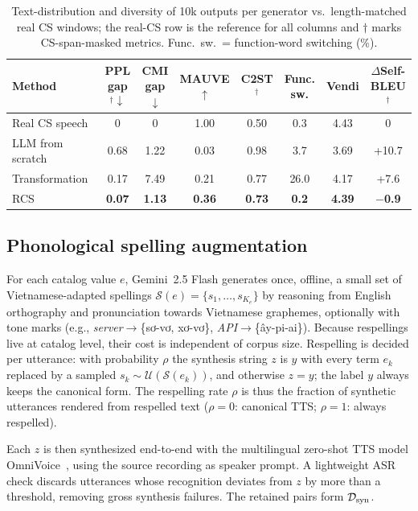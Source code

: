 \documentclass[letterpaper]{article}
\newcommand{\vi}[1]{{\fontencoding{T5}\selectfont #1}}
\newcommand{\vi}[1]{#1}
\newcommand{\cD}{\mathcal{D}}
\newcommand{\cS}{\mathcal{S}}
\begin{document}
\begin{table}[t]
  \centering
  \caption{Text-distribution and diversity of 10k outputs per
  generator vs.\ length-matched real CS windows; the real-CS row is
  the reference for all columns and $\dagger$ marks CS-span-masked
  metrics. Func.\ sw.\ = function-word switching (\%).}
  \label{tab:text}
  \small
  \setlength{\tabcolsep}{4pt}
  \begin{tabular}{@{}l ccccccc@{}}
    \toprule
    Method & PPL gap$^\dagger\downarrow$ & CMI gap$\downarrow$
    & MAUVE$\uparrow$ & C2ST$^\dagger$ & Func. sw.
    & Vendi & $\Delta$Self-BLEU$^\dagger$\\
    \midrule
    Real CS speech & 0 & 0 & 1.00 & 0.50 & 0.3 & 4.43 & 0\\
    LLM from scratch & 0.68 & 1.22 & 0.03 & 0.98 & 3.7 & 3.69 & +10.7\\
    Transformation~\cite{liu2026lens}
    & 0.17 & 7.49 & 0.21 & 0.77 & 26.0 & 4.17 & +7.6\\
    RCS & \textbf{0.07} & \textbf{1.13} & \textbf{0.36}
    & \textbf{0.73} & \textbf{0.2} & \textbf{4.39} & \textbf{$-$0.9}\\
    \bottomrule
  \end{tabular}
\end{table}
\subsection{Phonological spelling augmentation}
\label{sec:respell}
For each catalog value $e$, Gemini~2.5 Flash generates once, offline, a small set of Vietnamese-adapted spellings $\cS(e)=\{s_1,\dots,s_{K_e}\}$ by reasoning from English orthography and pronunciation towards Vietnamese graphemes, optionally with tone marks (e.g., \emph{server}$\rightarrow$\vi{\{sơ-vơ, xơ-vơ\}}, \emph{API}$\rightarrow$\vi{\{ây-pi-ai\}}). Because respellings live at catalog level, their cost is independent of corpus size. Respelling is decided per utterance: with probability $\rho$ the synthesis string $z$ is $y$ with every term $e_k$ replaced by a sampled $s_k\sim\mathcal{U}(\cS(e_k))$, and otherwise $z=y$; the label $y$ always keeps the canonical form. The respelling rate $\rho$ is thus the fraction of synthetic utterances rendered from respelled text ($\rho=0$: canonical TTS; $\rho=1$: always respelled).

Each $z$ is then synthesized end-to-end with the multilingual zero-shot TTS model OmniVoice~\cite{zhu2026omnivoice}, using the source recording as speaker prompt. A lightweight ASR check discards utterances whose recognition deviates from $z$ by more than a threshold, removing gross synthesis failures. The retained pairs form $\cD_{\rm syn}$.
\end{document}
